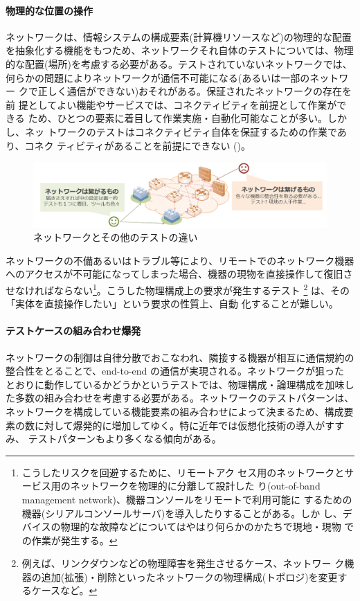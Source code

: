     \paragraph{物理的な位置の操作}
ネットワークは、情報システムの構成要素(計算機リソースなど)の物理的な配置
を抽象化する機能をもつため、ネットワークそれ自体のテストについては、物理
的な配置(場所)を考慮する必要がある。テストされていないネットワークでは、
何らかの問題によりネットワークが通信不可能になる(あるいは一部のネットワー
クで正しく通信ができない)おそれがある。保証されたネットワークの存在を前
提としてよい機能やサービスでは、コネクティビティを前提として作業ができる
ため、ひとつの要素に着目して作業実施・自動化可能なことが多い。しかし、ネッ
トワークのテストはコネクティビティ自体を保証するための作業であり、コネク
ティビティがあることを前提にできない
()。

 \begin{figure}[h]
  \centering
  \includegraphics[scale=0.45]{img/difficulty-of-network-testing.png}
  \caption{ネットワークとその他のテストの違い}
  \label{fig:difficulty-of-network-testing}
 \end{figure}

ネットワークの不備あるいはトラブル等により、リモートでのネットワーク機器
へのアクセスが不可能になってしまった場合、機器の現物を直接操作して復旧さ
せなければならない\footnote{こうしたリスクを回避するために、リモートアク
セス用のネットワークとサービス用のネットワークを物理的に分離して設計した
り(out-of-band management network)、機器コンソールをリモートで利用可能に
するための機器(シリアルコンソールサーバ)を導入したりすることがある。しか
し、デバイスの物理的な故障などについてはやはり何らかのかたちで現地・現物
での作業が発生する。}。こうした物理構成上の要求が発生するテスト
\footnote{例えば、リンクダウンなどの物理障害を発生させるケース、ネットワー
ク機器の追加(拡張)・削除といったネットワークの物理構成(トポロジ)を変更す
るケースなど。} は、その「実体を直接操作したい」という要求の性質上、自動
化することが難しい。

    \paragraph{テストケースの組み合わせ爆発}
ネットワークの制御は自律分散でおこなわれ、隣接する機器が相互に通信規約の
整合性をとることで、end-to-end の通信が実現される。ネットワークが狙った
とおりに動作しているかどうかというテストでは、物理構成・論理構成を加味し
た多数の組み合わせを考慮する必要がある。ネットワークのテストパターンは、
ネットワークを構成している機能要素の組み合わせによって決まるため、構成要
素の数に対して爆発的に増加してゆく。特に近年では仮想化技術の導入がすすみ、
テストパターンもより多くなる傾向がある。


